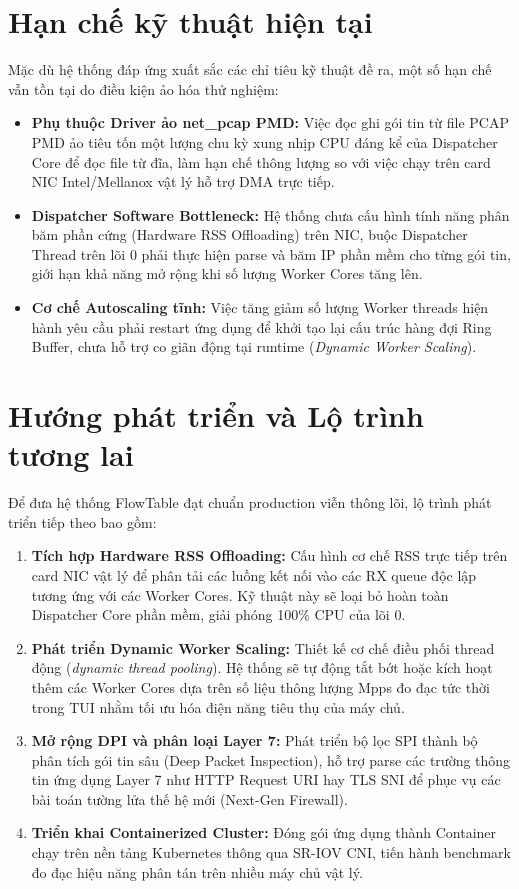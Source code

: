\documentclass[12pt,a4paper,twoside]{report}
\begin{document}
\section{Hạn chế kỹ thuật hiện tại}
Mặc dù hệ thống đáp ứng xuất sắc các chỉ tiêu kỹ thuật đề ra, một số hạn chế vẫn tồn tại do điều kiện ảo hóa thử nghiệm:
\begin{itemize}
    \item \textbf{Phụ thuộc Driver ảo net\_pcap PMD:} Việc đọc ghi gói tin từ file PCAP PMD ảo tiêu tốn một lượng chu kỳ xung nhịp CPU đáng kể của Dispatcher Core để đọc file từ đĩa, làm hạn chế thông lượng so với việc chạy trên card NIC Intel/Mellanox vật lý hỗ trợ DMA trực tiếp.
    \item \textbf{Dispatcher Software Bottleneck:} Hệ thống chưa cấu hình tính năng phân băm phần cứng (Hardware RSS Offloading) trên NIC, buộc Dispatcher Thread trên lõi 0 phải thực hiện parse và băm IP phần mềm cho từng gói tin, giới hạn khả năng mở rộng khi số lượng Worker Cores tăng lên.
    \item \textbf{Cơ chế Autoscaling tĩnh:} Việc tăng giảm số lượng Worker threads hiện hành yêu cầu phải restart ứng dụng để khởi tạo lại cấu trúc hàng đợi Ring Buffer, chưa hỗ trợ co giãn động tại runtime (\textit{Dynamic Worker Scaling}).
\end{itemize}

\section{Hướng phát triển và Lộ trình tương lai}
Để đưa hệ thống FlowTable đạt chuẩn production viễn thông lõi, lộ trình phát triển tiếp theo bao gồm:
\begin{enumerate}
    \item \textbf{Tích hợp Hardware RSS Offloading:} Cấu hình cơ chế RSS trực tiếp trên card NIC vật lý để phân tải các luồng kết nối vào các RX queue độc lập tương ứng với các Worker Cores. Kỹ thuật này sẽ loại bỏ hoàn toàn Dispatcher Core phần mềm, giải phóng 100\% CPU của lõi 0.
    \item \textbf{Phát triển Dynamic Worker Scaling:} Thiết kế cơ chế điều phối thread động (\textit{dynamic thread pooling}). Hệ thống sẽ tự động tắt bớt hoặc kích hoạt thêm các Worker Cores dựa trên số liệu thông lượng Mpps đo đạc tức thời trong TUI nhằm tối ưu hóa điện năng tiêu thụ của máy chủ.
    \item \textbf{Mở rộng DPI và phân loại Layer 7:} Phát triển bộ lọc SPI thành bộ phân tích gói tin sâu (Deep Packet Inspection), hỗ trợ parse các trường thông tin ứng dụng Layer 7 như HTTP Request URI hay TLS SNI để phục vụ các bài toán tường lửa thế hệ mới (Next-Gen Firewall).
    \item \textbf{Triển khai Containerized Cluster:} Đóng gói ứng dụng thành Container chạy trên nền tảng Kubernetes thông qua SR-IOV CNI, tiến hành benchmark đo đạc hiệu năng phân tán trên nhiều máy chủ vật lý.
\end{enumerate}
\end{document}
